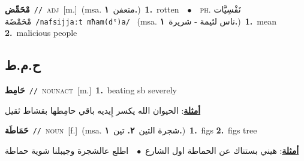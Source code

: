 \documentclass[10pt,a4paper,twoside]{article} %
\begin{document}
\begin{multicols}{2}
{\setlength\topsep{0pt}\textbf{\foreignlanguage{arabic}{مْحَمِّض}}\ {\color{gray}\texttt{//}\color{black}}\ \textsc{adj}\ [m.]\ \color{gray}(msa. \foreignlanguage{arabic}{متعفن}~\foreignlanguage{arabic}{\textbf{١.}})\color{black}\ \textbf{1.}~rotten\ \ $\bullet$\ \ \textsc{ph.} \color{gray} \foreignlanguage{arabic}{نَفْسِيَّات مْحَمْضَة}\color{black}\ {\color{gray}\texttt{/{\sffamily nafsijjaːt mħam(dˤ)a}/}\color{black}}\ \color{gray} (msa. \foreignlanguage{arabic}{ناس لئيمة - شريرة}~\foreignlanguage{arabic}{\textbf{١.}})\color{black}\ \textbf{1.}~mean  \textbf{2.}~malicious people\ } \vspace{2mm}

\vspace{-3mm}
\subsection*{\color{blue}\foreignlanguage{arabic}{ح.م.ط}\color{blue}{}} 

{\setlength\topsep{0pt}\textbf{\foreignlanguage{arabic}{حَامِط}}\ {\color{gray}\texttt{//}\color{black}}\ \textsc{noun\textunderscore act}\ [m.]\ \textbf{1.}~beating sb severely\  \begin{flushright}\color{gray}\foreignlanguage{arabic}{\textbf{\underline{\foreignlanguage{arabic}{أمثلة}}}: الحيوان الله يكسر إِيديه باقي حامِطها بقشاط ثقيل}\end{flushright}\color{black}} \vspace{2mm}

{\setlength\topsep{0pt}\textbf{\foreignlanguage{arabic}{حَمَاطَة}}\ {\color{gray}\texttt{//}\color{black}}\ \textsc{noun}\ [f.]\ \color{gray}(msa. \foreignlanguage{arabic}{شجرة التين}~\foreignlanguage{arabic}{\textbf{٢.}}  \foreignlanguage{arabic}{تين}~\foreignlanguage{arabic}{\textbf{١.}})\color{black}\ \textbf{1.}~figs  \textbf{2.}~figs tree\  \begin{flushright}\color{gray}\foreignlanguage{arabic}{\textbf{\underline{\foreignlanguage{arabic}{أمثلة}}}: هيني بستناك عن الحماطة اول الشارع\ $\bullet$\ \  اطلع عالشجرة وجيبلنا شوية حماطة}\end{flushright}\color{black}} \vspace{2mm}


\end{multicols}
\end{document}
